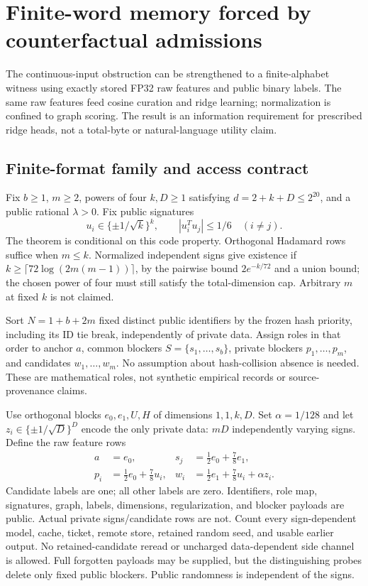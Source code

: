 \section{Finite-word memory forced by counterfactual admissions}
\label{sec:finite-word-admission-memory}

The continuous-input obstruction can be strengthened to a finite-alphabet
witness using exactly stored FP32 raw features and public binary labels.
The same raw features feed cosine curation and ridge learning; normalization
is confined to graph scoring.  The result is an information requirement for
prescribed ridge heads, not a total-byte or natural-language utility claim.

\subsection{Finite-format family and access contract}
Fix $b\ge1$, $m\ge2$, powers of four $k,D\ge1$ satisfying
$d=2+k+D\le2^{20}$, and a public rational $\lambda>0$.  Fix public signatures
\[
 u_i\in\{\pm1/\sqrt k\}^k,\qquad |u_i^Tu_j|\le1/6\quad(i\ne j).
\]
The theorem is conditional on this code property.  Orthogonal Hadamard rows
suffice when $m\le k$.  Normalized independent signs give existence if
$k\ge\lceil72\log(2m(m-1))\rceil$, by the pairwise bound
$2e^{-k/72}$ and a union bound; the chosen power of four must still satisfy
the total-dimension cap.  Arbitrary $m$ at fixed $k$ is not claimed.

Sort $N=1+b+2m$ fixed distinct public identifiers by the frozen hash priority,
including its ID tie break, independently of private data.  Assign roles in
that order to anchor $a$, common blockers $S=\{s_1,\ldots,s_b\}$, private
blockers $p_1,\ldots,p_m$, and candidates $w_1,\ldots,w_m$.  No assumption
about hash-collision absence is needed.  These are mathematical roles, not
synthetic empirical records or source-provenance claims.

Use orthogonal blocks $e_0,e_1,U,H$ of dimensions $1,1,k,D$.  Set
$\alpha=1/128$ and let $z_i\in\{\pm1/\sqrt D\}^D$ encode the only private
data: $mD$ independently varying signs.  Define the raw feature rows
\begin{equation}\label{eq:finite-raw-rows}
\begin{split}
 a&=e_0,&s_j&=\tfrac12e_0+\tfrac78e_1,\\
 p_i&=\tfrac12e_0+\tfrac78u_i,&
 w_i&=\tfrac12e_1+\tfrac78u_i+\alpha z_i.
\end{split}
\end{equation}
Candidate labels are one; all other labels are zero.  Identifiers, role map,
signatures, graph, labels, dimensions, regularization, and blocker payloads
are public.  Actual private signs/candidate rows are not.  Count every
sign-dependent model, cache, ticket, remote store, retained random seed,
and usable earlier output.  No retained-candidate reread or uncharged
data-dependent side channel is allowed.  Full forgotten payloads may be
supplied, but the distinguishing probes delete only fixed public blockers.
Public randomness is independent of the signs.

